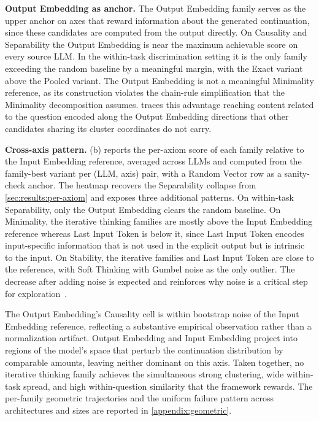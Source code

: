 \textbf{Output Embedding as anchor.} The Output Embedding family serves as the upper anchor on axes that reward information about the generated continuation, since these candidates are computed from the output directly. On Causality and Separability the Output Embedding is near the maximum achievable score on every source LLM. In the within-task discrimination setting it is the only family exceeding the random baseline by a meaningful margin, with the Exact variant above the Pooled variant. The Output Embedding is not a meaningful Minimality reference, as its construction violates the chain-rule simplification that the Minimality decomposition assumes.  traces this advantage reaching content related to the  question encoded along the Output Embedding directions that other candidates sharing its cluster coordinates do not carry.

\textbf{Cross-axis pattern.} (b) reports the per-axiom score of each family relative to the Input Embedding reference, averaged across LLMs and computed from the family-best variant per (LLM, axis) pair, with a Random Vector row as a sanity-check anchor. The heatmap recovers the Separability collapse from \cref{sec:results:per-axiom} and exposes three additional patterns. On within-task Separability, only the Output Embedding clears the random baseline. On Minimality, the iterative thinking families are mostly above the Input Embedding reference whereas Last Input Token is below it, since Last Input Token encodes input-specific information that is not used in the explicit output but is intrinsic to the input. On Stability, the iterative families and Last Input Token are close to the reference, with Soft Thinking with Gumbel noise as the only outlier. The decrease after adding noise is expected and reinforces why noise is a critical step for exploration~\citep{deng2025latentreasoningllmsvocabularyspace, wu2026llms}.

The Output Embedding's Causality cell is within bootstrap noise of the Input Embedding reference, reflecting a substantive empirical observation rather than a normalization artifact. Output Embedding and Input Embedding project into regions of the model's space that perturb the continuation distribution by comparable amounts, leaving neither dominant on this axis. Taken together, no iterative thinking family achieves the simultaneous strong clustering, wide within-task spread, and high within-question similarity that the framework rewards. The per-family geometric trajectories and the uniform failure pattern across architectures and sizes are reported in \cref{appendix:geometric}.

